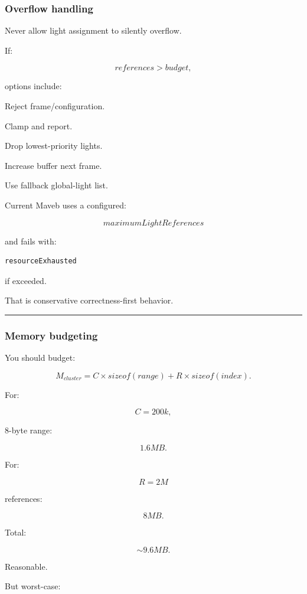 \subsubsection{Overflow handling}\label{overflow-handling}

Never allow light assignment to silently overflow.

If:

\[
references>budget,
\]

options include:

Reject frame/configuration.

Clamp and report.

Drop lowest-priority lights.

Increase buffer next frame.

Use fallback global-light list.

Current Maveb uses a configured:

\[
maximumLightReferences
\]

and fails with:

\begin{verbatim}
resourceExhausted
\end{verbatim}

if exceeded.

That is conservative correctness-first behavior.

\begin{center}\rule{0.5\linewidth}{0.5pt}\end{center}

\subsubsection{Memory budgeting}\label{memory-budgeting}

You should budget:

\[
M_{cluster}
=
C\times sizeof(range)
+
R\times sizeof(index).
\]

For:

\[
C=200k,
\]

8-byte range:

\[
1.6MB.
\]

For:

\[
R=2M
\]

references:

\[
8MB.
\]

Total:

\[
\sim9.6MB.
\]

Reasonable.

But worst-case:

